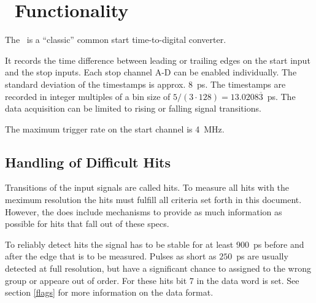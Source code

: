 \section{\deviceName\ Functionality}
	The \deviceName\ is a ``classic'' common start time-to-digital converter. 

	 { %
		It records the time difference between leading or trailing edges on the start input and the stop inputs. 
		Each stop channel A-D can be enabled individually. 
		The standard deviation of the timestamps is approx. $8$~ps. 
		The timestamps are recorded in integer multiples of a bin size of $5/(3\cdot 128) = 13.0208\overline{3}$~ps. 
		The data acquisition can be limited to rising or falling signal transitions. 
		
		The maximum trigger rate on the start channel is 4~MHz.
		
		\subsection{Handling of Difficult Hits}
			\label{difficulthits}
			Transitions of the input signals are called hits. To measure all hits with the meximum resolution the hits must fulfill all criteria set forth in this document.
			However, the \deviceName does include mechanisms to provide as much information as possible for hits that fall out of these specs.
		
			To reliably detect hits the signal has to be stable for at least $900$~ps before and after the edge that is to be measured. 
			Pulses as short as $250$~ps are usually detected at full resolution, but have a significant chance to assigned to the wrong group or appeare out of order. 
			For these hits bit 7 in the data word is set. See section \ref{flags} for more information on the data format.

}
